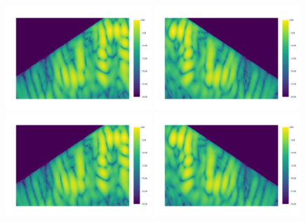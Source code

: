 \begin{figure}[hp]
    \centering
    \vspace{-1.5em} %
    \includegraphics[page=2, trim=0mm 10mm 0mm 20mm, clip, width=0.49\textwidth]{figures/multipath_nlos_wavefront1.pdf}
    \includegraphics[page=2, trim=0mm 10mm 0mm 20mm, clip, width=0.49\textwidth]{figures/multipath_nlos_wavefront2.pdf}
    \vspace{-1em} %
    \includegraphics[page=1, width=0.49\textwidth]{figures/multipath_nlos_wavefront1.pdf}
    \includegraphics[page=1, width=0.49\textwidth]{figures/multipath_nlos_wavefront2.pdf}

\end{figure}
